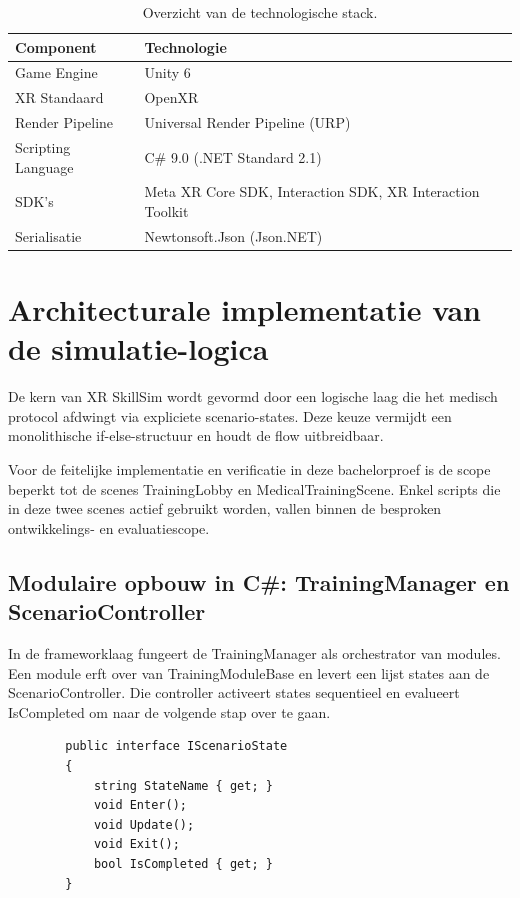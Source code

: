 \begin{table}[htbp]
    \centering

    \label{tab:tech_stack}
    \begin{tabular}{|l|l|}
        \hline
        \textbf{Component} & \textbf{Technologie} \\ \hline
        Game Engine & Unity 6 \\ \hline
        XR Standaard & OpenXR \\ \hline
        Render Pipeline & Universal Render Pipeline (URP) \\ \hline
        Scripting Language & C\# 9.0 (.NET Standard 2.1) \\ \hline
        SDK's & Meta XR Core SDK, Interaction SDK, XR Interaction Toolkit \\ \hline
        Serialisatie & Newtonsoft.Json (Json.NET) \\ \hline
    \end{tabular}
    \caption{Overzicht van de technologische stack.}
\end{table}

\section{Architecturale implementatie van de simulatie-logica}

De kern van XR SkillSim wordt gevormd door een logische laag die het medisch protocol afdwingt via expliciete scenario-states. Deze keuze vermijdt een monolithische if-else-structuur en houdt de flow uitbreidbaar.

Voor de feitelijke implementatie en verificatie in deze bachelorproef is de scope beperkt tot de scenes TrainingLobby en MedicalTrainingScene. Enkel scripts die in deze twee scenes actief gebruikt worden, vallen binnen de besproken ontwikkelings- en evaluatiescope.

\subsection{Modulaire opbouw in C\#: TrainingManager en ScenarioController}

In de frameworklaag fungeert de TrainingManager als orchestrator van modules. Een module erft over van TrainingModuleBase en levert een lijst states aan de ScenarioController. Die controller activeert states sequentieel en evalueert IsCompleted om naar de volgende stap over te gaan.

\begin{listing}[ht]
    \begin{verbatim}
        public interface IScenarioState
        {
            string StateName { get; }
            void Enter();
            void Update();
            void Exit();
            bool IsCompleted { get; }
        }
    \end{verbatim}
    \caption{De IScenarioState interface zoals gebruikt door de ScenarioController.}
    \label{listing:scenario_state}
\end{listing}

